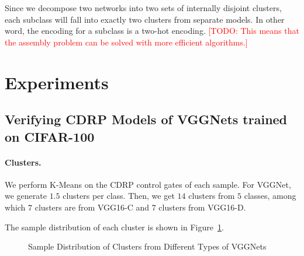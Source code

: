 \documentclass[sigplan,10pt,review]{acmart}\settopmatter{printfolios=true,printccs=false,printacmref=false}
\newcommand{\todo}[1]{\textcolor{red}{[TODO: #1]}}
\begin{document}
Since we decompose two networks into two sets of internally disjoint clusters, each subclass will fall into exactly two clusters from separate models.
In other word, the encoding for a subclass is a two-hot encoding.
\todo{This means that the assembly problem can be solved with more efficient algorithms.}

\section{Experiments}
\subsection{Verifying CDRP Models of VGGNets trained on CIFAR-100}
\paragraph{Clusters.} We perform K-Means on the CDRP control gates of each sample. 
For VGGNet, we generate $1.5$ clusters per class.
Then, we get $14$ clusters from $5$ classes, among which $7$ clusters are from VGG16-C and $7$ clusters from VGG16-D. 

The sample distribution of each cluster is shown in Figure~\ref{fig:vgg-cluster}.

\begin{figure}[!htp]
    \centering
{}

{}
    \caption{Sample Distribution of Clusters from Different Types of VGGNets}
    \label{fig:vgg-cluster}

\end{figure}
\end{document}

